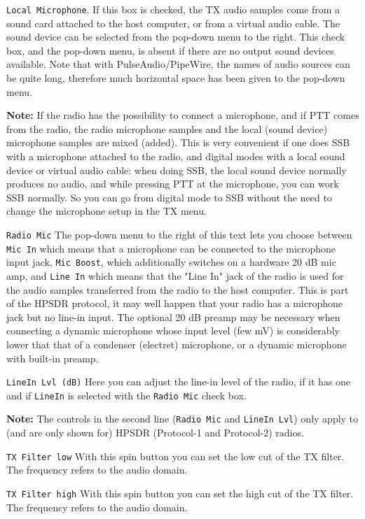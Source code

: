 \documentclass[12pt]{book}
\def\rett#1{\texttt{\color{red}#1}}
\begin{document}
\rett{Local Microphone}. If this box is checked, the TX audio samples come from a sound card
attached to the host computer, or from a virtual audio cable. The sound device can be
selected from the pop-down menu to the right.
This check box, and the pop-down menu, is absent if
there are no output sound devices available. Note that with PulseAudio/PipeWire, the
names of audio sources can be quite long, therefore much horizontal space has been
given to the pop-down menu.

\textbf{Note:} If the radio has the possibility
to connect a microphone, and if PTT comes from the radio, the radio microphone samples
and the local (sound device) microphone samples are mixed (added). This is very convenient
if one does SSB with a microphone attached to the radio, and digital modes with a
local sound device or virtual audio cable: when doing SSB, the local sound device normally
produces no audio, and while pressing PTT at the microphone, you can work SSB normally.
So you can go from digital mode to SSB without the need to change the microphone setup
in the TX menu.

\rett{Radio Mic} The pop-down menu to the right of this text
lets you choose between \rett{Mic In} which means
that a microphone can be connected to the microphone input jack, \rett{Mic Boost}, which
additionally switches on a hardware 20 dB mic amp, and \rett{Line In} which means that the
"Line In" jack of the radio is used for the audio samples transferred from the radio to the
host computer. This is part of the HPSDR protocol, it may well happen that your radio has a
microphone jack but no line-in input. The optional 20 dB preamp may be necessary when connecting
a dynamic microphone whose input level (few mV) is considerably lower that that of a
condenser (electret) microphone, or a dynamic microphone with built-in preamp.

\rett{LineIn Lvl (dB)} Here you can adjust the line-in level of the radio, if it
has one and if \rett{LineIn} is selected with the \rett{Radio Mic} check box.

\textbf{Note:} The controls in the second line (\rett{Radio Mic} and \rett{LineIn Lvl}) only
apply to (and are only
shown for) HPSDR (Protocol-1 and Protocol-2) radios.

\rett{TX Filter low} With this spin button you can set the low cut of the TX filter. The
frequency refers to the audio domain.

\rett{TX Filter high} With this spin button you can set the high cut of the TX filter. The
frequency refers to the audio domain.
\end{document}

